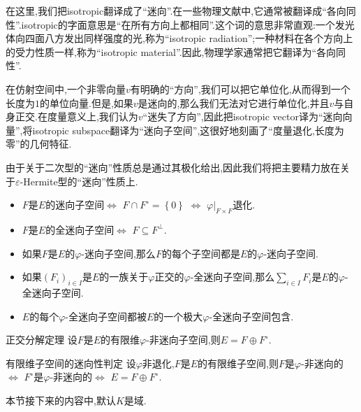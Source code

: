 \begin{remark}{}{}
	在这里,我们把isotropic翻译成了``迷向''.在一些物理文献中,它通常被翻译成``各向同性''.isotropic的字面意思是``在所有方向上都相同''.这个词的意思非常直观:一个发光体向四面八方发出同样强度的光,称为``isotropic radiation'';一种材料在各个方向上的受力性质一样,称为``isotropic material''.因此,物理学家通常把它翻译为``各向同性''.
	
	在仿射空间中,一个非零向量$v$有明确的``方向'',我们可以把它单位化,从而得到一个长度为$1$的单位向量.但是,如果$v$是迷向的,那么我们无法对它进行单位化,并且$v$与自身正交.在度量意义上,我们认为$v$``迷失了方向'',因此把isotropic vector译为``迷向向量'',将isotropic subspace翻译为``迷向子空间'',这很好地刻画了``度量退化,长度为零''的几何特征.
\end{remark}

\begin{remark}{}{}
	由于关于二次型的``迷向''性质总是通过其极化给出,因此我们将把主要精力放在关于$\varepsilon$-Hermite型的``迷向''性质上.
	\begin{itemize}
		\item $F$是$E$的迷向子空间$\iff$ $F\cap F^{\circ}=\left\{0\right\}$ $\iff$ $\varphi|_{F\times F}$退化.
		\item $F$是$E$的全迷向子空间$\iff$ $F\subseteq F^{\perp}$.
		\item 如果$F$是$E$的$\varphi$-迷向子空间,那么$F$的每个子空间都是$E$的$\varphi$-迷向子空间.
		\item 如果$\left(F_{i}\right)_{i\in I}$是$E$的一族关于$\varphi$正交的$\varphi$-全迷向子空间,那么$\sum\limits_{i\in I}F_{i}$是$E$的$\varphi$-全迷向子空间.
		\item $E$的每个$\varphi$-全迷向子空间都被$E$的一个极大$\varphi$-全迷向子空间包含.
	\end{itemize}
\end{remark}

\begin{proposition}{正交分解定理}{}
	设$F$是$E$的有限维$\varphi$-非迷向子空间,则$E=F\oplus F^{\circ}$.
\end{proposition}

\begin{corollary}{有限维子空间的迷向性判定}{}
	设$\varphi$非退化,$F$是$E$的有限维子空间,则$F$是$\varphi$-非迷向的$\iff$ $F^{\circ}$是$\varphi$-非迷向的$\iff$ $E=F\oplus F^{\circ}$.
\end{corollary}

本节接下来的内容中,默认$K$是域.

